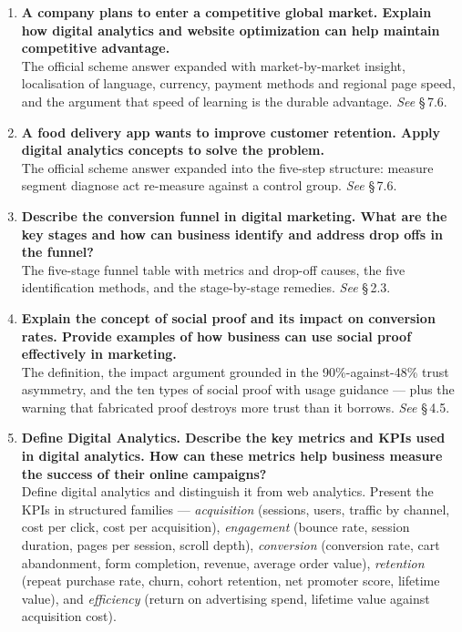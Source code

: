 \begin{enumerate}[leftmargin=2.2em,itemsep=1.4ex]
\item \textbf{A company plans to enter a competitive global market. Explain how
      digital analytics and website optimization can help maintain competitive
      advantage.} \\
      The official scheme answer expanded with market-by-market insight,
      localisation of language, currency, payment methods and regional page speed,
      and the argument that speed of learning is the durable advantage.
      \hfill\emph{See} \S\,7.6.

\item \textbf{A food delivery app wants to improve customer retention. Apply
      digital analytics concepts to solve the problem.}
      \\
      The official scheme answer expanded into the five-step structure: measure
      \ra{} segment \ra{} diagnose \ra{} act \ra{} re-measure against a control
      group. \hfill\emph{See} \S\,7.6.

\item \textbf{Describe the conversion funnel in digital marketing. What are the key
      stages and how can business identify and address drop offs in the funnel?}
      \\
      The five-stage funnel table with metrics and drop-off causes, the five
      identification methods, and the stage-by-stage remedies.
      \hfill\emph{See} \S\,2.3.

\item \textbf{Explain the concept of social proof and its impact on conversion
      rates. Provide examples of how business can use social proof effectively in
      marketing.} \\
      The definition, the impact argument grounded in the 90\%-against-48\% trust
      asymmetry, and the ten types of social proof with usage guidance --- plus the
      warning that fabricated proof destroys more trust than it borrows.
      \hfill\emph{See} \S\,4.5.

\item \textbf{Define Digital Analytics. Describe the key metrics and KPIs used in
      digital analytics. How can these metrics help business measure the success of
      their online campaigns?} \\
      Define digital analytics and distinguish it from web analytics. Present the
      KPIs in structured families --- \emph{acquisition} (sessions, users, traffic
      by channel, cost per click, cost per acquisition), \emph{engagement} (bounce
      rate, session duration, pages per session, scroll depth), \emph{conversion}
      (conversion rate, cart abandonment, form completion, revenue, average order
      value), \emph{retention} (repeat purchase rate, churn, cohort retention, net
      promoter score, lifetime value), and \emph{efficiency} (return on advertising
      spend, lifetime value against acquisition cost).


\end{enumerate}
